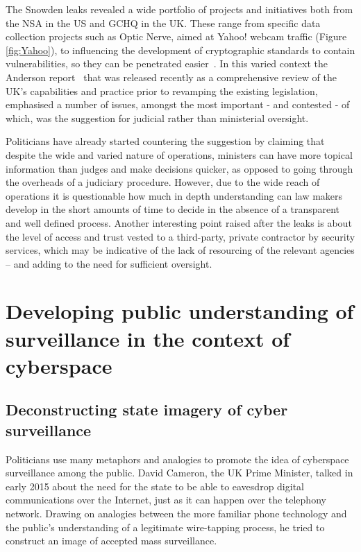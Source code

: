 \documentclass{llncs}
\begin{document}
The Snowden leaks revealed a wide portfolio of projects and initiatives both from the NSA in the US and GCHQ in the UK. These range from specific data collection projects such as Optic Nerve, aimed at Yahoo! webcam traffic (Figure \ref{fig:Yahoo}), to influencing the development of cryptographic standards to contain vulnerabilities, so they can be penetrated easier~\cite{ECDH}. In this varied context the Anderson report~\cite{Anderson} that was released recently as a comprehensive review of the UK's capabilities and practice prior to revamping the existing legislation, emphasised a number of issues, amongst the most important - and contested - of which, was the suggestion for judicial rather than ministerial oversight.

Politicians have already started countering the suggestion by claiming that despite the wide and varied nature of operations, ministers can have more topical information than judges and make decisions quicker, as opposed to going through the overheads of a judiciary procedure. However, due to the wide reach of operations it is questionable how much in depth understanding can law makers develop in the short amounts of time to decide in the absence of a transparent and well defined process. Another interesting point raised after the leaks is about the level of access and trust vested to a third-party, private contractor by security services, which may be indicative of the lack of resourcing of the relevant agencies -- and adding to the need for sufficient oversight.

\section{Developing public understanding of surveillance in the context of cyberspace}
\label{sec:Understanding}
\subsection{Deconstructing state imagery of cyber surveillance}
Politicians use many metaphors and analogies to promote the idea of cyberspace surveillance among the public. David Cameron, the UK Prime Minister, talked in early 2015 about the need for the state to be able to eavesdrop digital communications over the Internet, just as it can happen over the telephony network. Drawing on analogies between the more familiar phone technology and the public's understanding of a legitimate wire-tapping process, he tried to construct an image of accepted mass surveillance.
\end{document}
